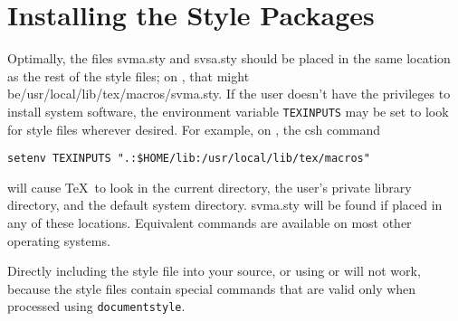 \chapter{Installing the Style Packages}
Optimally, the files svma.sty and svsa.sty
 should be placed in the same location
as the rest of the style files; on \UNX, that might be\linebreak[4]
/usr/local/lib/tex/macros/svma.sty.
If the user doesn't have the privileges to install system software,
the environment variable \verb|TEXINPUTS| may be set to look for
style files wherever desired.  For example, on \UNX, the csh command
\begin{verbatim}
setenv TEXINPUTS ".:$HOME/lib:/usr/local/lib/tex/macros"
\end{verbatim}
will cause \TeX\ to look in the current directory, the user's private
library directory, and the default system directory.  svma.sty will be
found if placed in any of these locations.  Equivalent commands are
available on most other operating systems.

Directly including the style file into your source, or using \verb||
or \verb|| will not work, because the style files contain
special commands that are valid only when processed using
\verb|documentstyle|.

